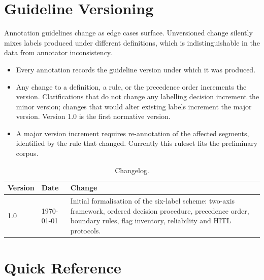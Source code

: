 \section{Guideline Versioning}
\label{sec:versioning}

Annotation guidelines change as edge cases surface. Unversioned change silently mixes labels produced under different definitions, which is indistinguishable in the data from annotator inconsistency.

\begin{itemize}
  \item {} Every annotation records the guideline version under which it was produced.
  \item {} Any change to a definition, a rule, or the precedence order increments the version. Clarifications that do not change any labelling decision increment the minor version; changes that would alter existing labels increment the major version. Version 1.0 is the first normative version. 
  \item {} A major version increment requires re-annotation of the affected segments, identified by the rule that changed. Currently this ruleset fits the preliminary corpus.
\end{itemize}

\begin{table}[htbp]
\centering
\small
\caption{Changelog.}
\label{tab:changelog}
\renewcommand{\arraystretch}{1.3}
\begin{tabularx}{\textwidth}{@{}l l X@{}}
\toprule
\textbf{Version} & \textbf{Date} & \textbf{Change} \\
\midrule
1.0 & \today & Initial formalisation of the six-label scheme: two-axis framework, ordered decision procedure, precedence order, boundary rules, flag inventory, reliability and HITL protocols. \\
\bottomrule
\end{tabularx}
\end{table}

\section{Quick Reference}
\label{sec:quickref}

